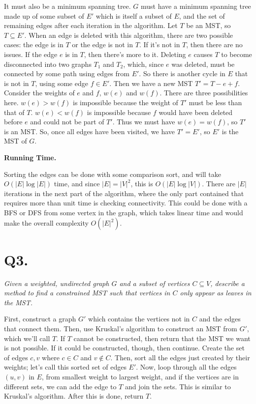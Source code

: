 \documentclass{article}
\begin{document}
It must also be a minimum spanning tree. $G$ must have a minimum spanning tree made up of some subset of $E'$ which is itself a subset of $E$, and the set of remaining edges after each iteration in the algorithm. Let $T$ be an MST, so $T \subseteq E'$. When an edge is deleted with this algorithm, there are two possible cases: the edge is in $T$ or the edge is not in $T$. If it's not in $T$, then there are no issues. If the edge $e$ is in $T$, then there's more to it. Deleting $e$ causes $T$ to become disconnected into two graphs $T_1$ and $T_2$, which, since $e$ was deleted, must be connected by some path using edges from $E'$. So there is another cycle in $E$ that is not in $T$, using some edge $f \in E'$. Then we have a new MST $T' = T - e + f$. Consider the weights of $e$ and $f$, $w(e)$ and $w(f)$. There are three possibilities here. $w(e) > w(f)$ is impossible because the weight of $T'$ must be less than that of $T$. $w(e) < w(f)$ is impossible because $f$ would have been deleted before $e$ and could not be part of $T'$. Thus we must have $w(e) = w(f)$, so $T'$ is an MST. So, once all edges have been visited, we have $T' = E'$, so $E'$ is the MST of $G$. 

\smallskip

\noindent\textbf{Running Time.}

Sorting the edges can be done with some comparison sort, and will take $O(|E|\log|E|)$ time, and since $|E| = |V|^2$, this is $O(|E|\log|V|)$. There are $|E|$ iterations in the next part of the algorithm, where the only part contained that requires more than unit time is checking connectivity. This could be done with a BFS or DFS from some vertex in the graph, which takes linear time and would make the overall complexity $O(|E|^2)$.









\section*{Q3. }

\textit{Given a weighted, undirected graph $G$ and a subset of vertices $C \subseteq V$, describe a method to find a constrained MST such that vertices in $C$ only appear as leaves in the MST.}

First, construct a graph $G'$ which contains the vertices not in $C$ and the edges that connect them. Then, use Kruskal's algorithm to construct an MST from $G'$, which we'll call $T$. If $T$ cannot be constructed, then return that the MST we want is not possible. If it could be constructed, though, then continue. Create the set of edges $c, v$ where $c \in C$ and $v \notin C$. Then, sort all the edges just created by their weights; let's call this sorted set of edges $E'$. Now, loop through all the edges $(u,v)$ in $E$, from smallest weight to largest weight, and if the vertices are in different sets, we can add the edge to $T$ and join the sets. This is similar to Kruskal's algorithm. After this is done, return $T$.
\end{document}
